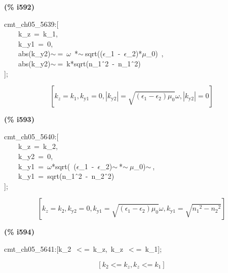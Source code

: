\documentclass[fleqn]{article}
\begin{document}
\noindent
\begin{minipage}[t]{4.000000em}\color{red}\bfseries
(\% i592)	
\end{minipage}
\begin{minipage}[t]{\textwidth}\color{blue}
cmt\_ch05\_5639:[\\
\ \ \ \ k\_z\ =\ k\_1,\ \\
\ \ \ \ k\_y1\ =\ 0,\\
\ \ \ \ abs(k\_y2)\ensuremath{\sim\ }=\ \ensuremath{\omega}\ *\ensuremath{\sim\ }sqrt((\ensuremath{\epsilon}\_1\ -\ \ensuremath{\epsilon}\_2)*\ensuremath{\mu}\_0)\ ,\\
\ \ \ \ abs(k\_y2)\ensuremath{\sim\ }=\ k*sqrt(n\_1\^\ 2\ -\ n\_1\^\ 2)\\
];
\end{minipage}
\[\displaystyle \tag{\% o592} 
\left[ {k_z}={k_1}\operatorname{,}{k_{\ensuremath{\mathrm{y1}}}}=0\operatorname{,}\left| {k_{\ensuremath{\mathrm{y2}}}}\right| =\sqrt{\left( {{\epsilon }_1}-{{\epsilon }_2}\right)  {{\mu }_0}} \omega \operatorname{,}\left| {k_{\ensuremath{\mathrm{y2}}}}\right| =0\right] \mbox{}
\]


\noindent
\begin{minipage}[t]{4.000000em}\color{red}\bfseries
(\% i593)	
\end{minipage}
\begin{minipage}[t]{\textwidth}\color{blue}
cmt\_ch05\_5640:[\\
\ \ \ \ k\_z\ =\ k\_2,\ \\
\ \ \ \ k\_y2\ =\ 0,\\
\ \ \ \ k\_y1\ =\ \ensuremath{\omega}*sqrt(\ (\ensuremath{\epsilon}\_1\ -\ \ensuremath{\epsilon}\_2)\ensuremath{\sim\ }*\ensuremath{\sim\ }\ensuremath{\mu}\_0)\ensuremath{\sim\ },\\
\ \ \ \ k\_y1\ =\ sqrt(n\_1\^\ 2\ -\ n\_2\^\ 2)\\
];
\end{minipage}
\[\displaystyle \tag{\% o593} 
\left[ {k_z}={k_2}\operatorname{,}{k_{\ensuremath{\mathrm{y2}}}}=0\operatorname{,}{k_{\ensuremath{\mathrm{y1}}}}=\sqrt{\left( {{\epsilon }_1}-{{\epsilon }_2}\right)  {{\mu }_0}} \omega \operatorname{,}{k_{\ensuremath{\mathrm{y1}}}}=\sqrt{{{{n_1}}^{2}}-{{{n_2}}^{2}}}\right] \mbox{}
\]


\noindent
\begin{minipage}[t]{4.000000em}\color{red}\bfseries
(\% i594)	
\end{minipage}
\begin{minipage}[t]{\textwidth}\color{blue}
cmt\_ch05\_5641:[k\_2\ \ensuremath{<}=\ k\_z,\ k\_z\ \ensuremath{<}=\ k\_1];
\end{minipage}
\[\displaystyle \tag{\% o594} 
\left[ {k_2}\operatorname{<  =}{k_z}\operatorname{,}{k_z}\operatorname{<  =}{k_1}\right] \mbox{}
\]
\end{document}
